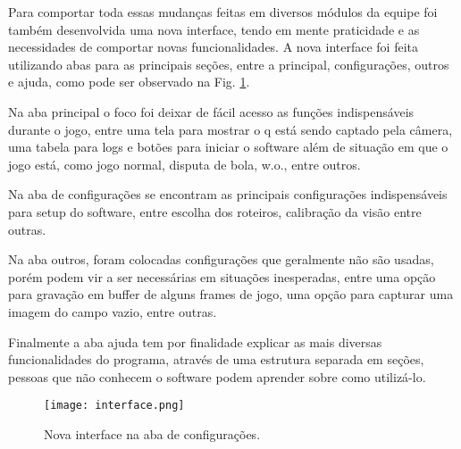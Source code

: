 Para comportar toda essas mudanças feitas em diversos módulos da equipe foi também desenvolvida uma nova interface, tendo em mente praticidade e as necessidades de comportar novas funcionalidades. A nova interface foi feita utilizando abas para as principais seções, entre a principal, configurações, outros e ajuda, como pode ser observado na Fig. \ref{fig:interface}.

Na aba principal o foco foi deixar de fácil acesso as funções indispensáveis durante o jogo, entre uma tela para mostrar o q está sendo captado pela câmera, uma tabela para logs e botões para iniciar o software além de situação em que o jogo está, como jogo normal, disputa de bola, w.o., entre outros.

Na aba de configurações se encontram as principais configurações indispensáveis para setup do software, entre escolha dos roteiros, calibração da visão entre outras.

Na aba outros, foram colocadas configurações que geralmente não são usadas, porém podem vir a ser necessárias em situações inesperadas, entre uma opção para gravação em buffer de alguns frames de jogo, uma opção para capturar uma imagem do campo vazio, entre outras.

Finalmente a aba ajuda tem por finalidade explicar as mais diversas funcionalidades do programa, através de uma estrutura separada em seções, pessoas que não conhecem o software podem aprender sobre como utilizá-lo.

\begin{figure}[!htb]
\centering
\texttt{[image: interface.png]}
\caption{Nova interface na aba de configurações.}
\label{fig:interface}
\end{figure}
